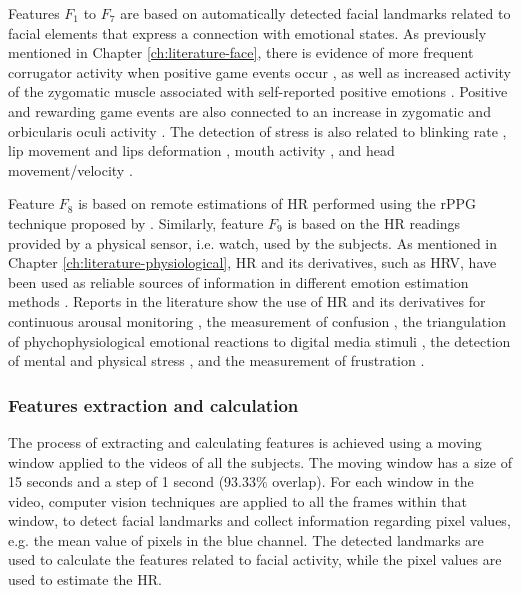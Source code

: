 Features $F_1$ to $F_7$ are based on automatically detected facial landmarks related to facial elements that express a connection with emotional states. As previously mentioned in Chapter \ref{ch:literature-face}, there is evidence of more frequent corrugator activity when positive game events occur \parencite{hazlett2006measuring}, as well as increased activity of the zygomatic muscle associated with self-reported positive emotions \parencite{tijs2008dynamic}. Positive and rewarding game events are also connected to an increase in zygomatic and orbicularis oculi activity \parencite{ravaja20051}. The detection of stress is also related to blinking rate \parencite{giannakakis2017stress,dinges2005optical}, lip movement \parencite{dinges2005optical} and lips deformation \parencite{metaxas2004image,giannakakis2017stress}, mouth activity \parencite{liao2005decision}, and head movement/velocity \parencite{giannakakis2017stress}.

Feature $F_8$ is based on remote estimations of HR performed using the rPPG technique proposed by \textcite{poh2011advancements}. Similarly, feature $F_9$ is based on the HR readings provided by a physical sensor, i.e. watch, used by the subjects. As mentioned in Chapter \ref{ch:literature-physiological}, HR and its derivatives, such as HRV, have been used as reliable sources of information in different emotion estimation methods \parencite{kukolja2014comparative}. Reports in the literature show the use of HR and its derivatives for continuous arousal monitoring \parencite{grundlehner2009design}, the measurement of confusion \parencite{xiao2015towards}, the triangulation of phychophysiological emotional reactions to digital media stimuli \parencite{nogueira2015annotation}, the detection of mental and physical stress \parencite{vandeput2009heart,garde2002effects}, and the measurement of frustration \parencite{rodriguez2015vr}.

\subsubsection{Features extraction and calculation}

The process of extracting and calculating features is achieved using a moving window applied to the videos of all the subjects. The moving window has a size of 15 seconds and a step of 1 second (93.33\% overlap). For each window in the video, computer vision techniques are applied to all the frames within that window, to detect facial landmarks and collect information regarding pixel values, e.g. the mean value of pixels in the blue channel. The detected landmarks are used to calculate the features related to facial activity, while the pixel values are used to estimate the HR.

